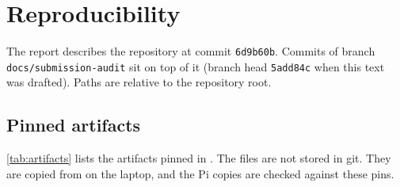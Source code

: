 \section{Reproducibility}\label{sec:repro}

The report describes the repository at commit \texttt{6d9b60b}. Commits of branch \texttt{docs/}\allowbreak\texttt{submission-}\allowbreak\texttt{audit} sit on top of it (branch head \texttt{5add84c} when this text was drafted). Paths are relative to the repository root.

\subsection{Pinned artifacts}

\cref{tab:artifacts} lists the artifacts pinned in . The files are not stored in git. They are copied from  on the laptop, and the Pi copies are checked against these pins.

